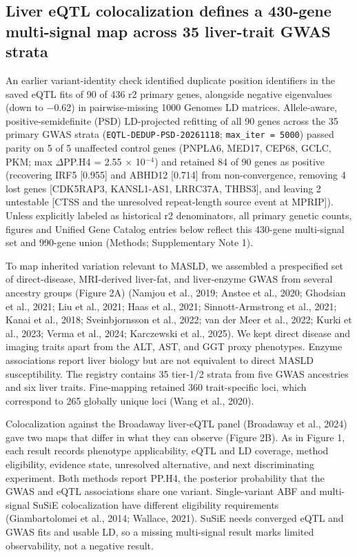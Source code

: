 \subsection{Liver eQTL colocalization defines a 430-gene multi-signal map across 35 liver-trait GWAS strata}\label{liver-eqtl-colocalization-defines-a-provisional-436-gene-map-across-35-liver-trait-gwas-strata}

An earlier variant-identity check identified duplicate position identifiers in the saved eQTL fits of 90 of 436 r2 primary genes, alongside negative eigenvalues (down to $-$0.62) in pairwise-missing 1000 Genomes LD matrices. Allele-aware, positive-semidefinite (PSD) LD-projected refitting of all 90 genes across the 35 primary GWAS strata (\texttt{EQTL-DEDUP-PSD-20261118}; \texttt{max\_iter = 5000}) passed parity on 5 of 5 unaffected control genes (PNPLA6, MED17, CEP68, GCLC, PKM; max \textbar $\Delta$PP.H4\textbar{} = 2.55 $\times$ 10$^{-4}$) and retained 84 of 90 genes as positive (recovering IRF5 [0.955] and ABHD12 [0.714] from non-convergence, removing 4 lost genes [CDK5RAP3, KANSL1-AS1, LRRC37A, THBS3], and leaving 2 untestable [CTSS and the unresolved repeat-length source event at MPRIP]). Unless explicitly labeled as historical r2 denominators, all primary genetic counts, figures and Unified Gene Catalog entries below reflect this 430-gene multi-signal set and 990-gene union (Methods; Supplementary Note 1).

To map inherited variation relevant to MASLD, we assembled a prespecified set of direct-disease, MRI-derived liver-fat, and liver-enzyme GWAS from several ancestry groups (Figure 2A) (Namjou et al., 2019; Anstee et al., 2020; Ghodsian et al., 2021; Liu et al., 2021; Haas et al., 2021; Sinnott-Armstrong et al., 2021; Kanai et al., 2018; Sveinbjornsson et al., 2022; van der Meer et al., 2022; Kurki et al., 2023; Verma et al., 2024; Karczewski et al., 2025). We kept direct disease and imaging traits apart from the ALT, AST, and GGT proxy phenotypes. Enzyme associations report liver biology but are not equivalent to direct MASLD susceptibility. The registry contains 35 tier-1/2 strata from five GWAS ancestries and six liver traits. Fine-mapping retained 360 trait-specific loci, which correspond to 265 globally unique loci (Wang et al., 2020).

Colocalization against the Broadaway liver-eQTL panel (Broadaway et al., 2024) gave two maps that differ in what they can observe (Figure 2B). As in Figure 1, each result records phenotype applicability, eQTL and LD coverage, method eligibility, evidence state, unresolved alternative, and next discriminating experiment. Both methods report PP.H4, the posterior probability that the GWAS and eQTL associations share one variant. Single-variant ABF and multi-signal SuSiE colocalization have different eligibility requirements (Giambartolomei et al., 2014; Wallace, 2021). SuSiE needs converged eQTL and GWAS fits and usable LD, so a missing multi-signal result marks limited observability, not a negative result.

